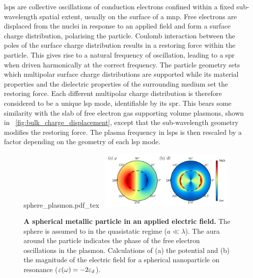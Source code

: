 \documentclass{article}
\begin{document}
\Glspl{lsp} are collective oscillations of conduction electrons confined within a fixed sub-wavelength spatial extent, usually on the surface of a \gls{mnp}. Free electrons are displaced from the nuclei in response to an applied field and form a surface charge distribution, polarising the particle. Coulomb interaction between the poles of the surface charge distribution results in a restoring force within the particle. This gives rise to a natural frequency of oscillation, leading to a \gls{spr} when driven harmonically at the correct frequency.
The particle geometry sets which multipolar surface charge distributions are supported while its material properties and the dielectric properties of the surrounding medium set the restoring force. Each different multipolar charge distribution is therefore considered to be a unique \gls{lsp} mode, identifiable by its \gls{spr}.
This bears some similarity with the slab of free electron gas supporting volume plasmons, shown in \figurename~\ref{fig:bulk_charge_displacement}, except that the sub-wavelength geometry modifies the restoring force. The plasma frequency in \glspl{lsp} is then rescaled by a factor depending on the geometry of each \gls{lsp} mode. %

\begin{figure}[bt]
\centering
{\fontsize{10pt}{1em}\selectfont
\def\svgwidth{0.35\textwidth}
{sphere_plasmon.pdf_tex}}
~\includegraphics[width=0.59\textwidth]{figures/spherical_np_dipole_lsp}
{\caption[A spherical metallic particle in an applied electric field]{\textbf{A spherical metallic particle in an applied electric field.} The sphere is assumed to in the quasistatic regime ($a\ll\lambda$). The aura around the particle indicates the phase of the free electron oscillations in the plasmon. Calculations of (a) the potential and (b) the magnitude of the electric field for a spherical nanoparticle on resonance ($\varepsilon(\omega)=-2\varepsilon_d$).}
\label{fig:sphere_plasmon}}
\end{figure}
\end{document}

